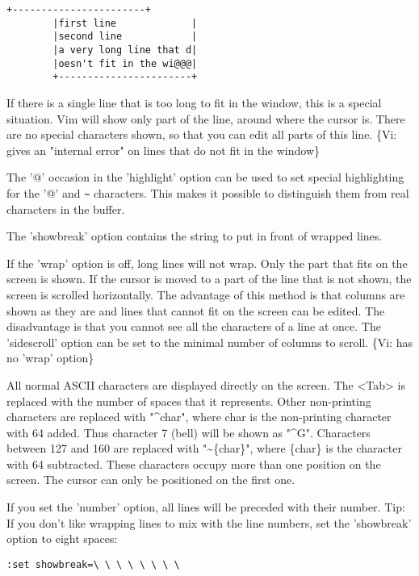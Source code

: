 \begin{Verbatim}[samepage=true]
		+-----------------------+
		|first line             |
		|second line            |
		|a very long line that d|
		|oesn't fit in the wi@@@|
		+-----------------------+
\end{Verbatim}

If there is a single line that is too long to fit in the window, this is a special situation.
Vim will show only part of the line, around where the cursor is.
There are no special characters shown, so that you can edit all parts of this line.
\{Vi: gives an "internal error" on lines that do not fit in the window\}

The '@' occasion in the 'highlight' option can be used to set special highlighting for the '@' and \verb'~' characters.
This makes it possible to distinguish them from real characters in the buffer.

The 'showbreak' option contains the string to put in front of wrapped lines.

\label{wrap-off}
If the 'wrap' option is off, long lines will not wrap.
Only the part that fits on the screen is shown.
If the cursor is moved to a part of the line that is not shown, the screen is scrolled horizontally.
The advantage of this method is that columns are shown as they are and lines that cannot fit on the screen can be edited.
The disadvantage is that you cannot see all the characters of a line at once.
The 'sidescroll' option can be set to the minimal number of columns to scroll.
\{Vi: has no 'wrap' option\}

All normal ASCII characters are displayed directly on the screen.
The <Tab> is replaced with the number of spaces that it represents.
Other non-printing characters are replaced with "\textasciicircum {char}", where {char} is the non-printing character with 64 added.
Thus character 7 (bell) will be shown as "\textasciicircum G".
Characters between 127 and 160 are replaced with "\textasciitilde \{char\}", where \{char\} is the character with 64 subtracted.
These characters occupy more than one position on the screen.
The cursor can only be positioned on the first one.

 If you set the 'number' option, all lines will be preceded with their
 number.  Tip: If you don't like wrapping lines to mix with the line numbers,
 set the 'showbreak' option to eight spaces:
\begin{Verbatim}[samepage=true]
		:set showbreak=\ \ \ \ \ \ \ \ 
\end{Verbatim}

